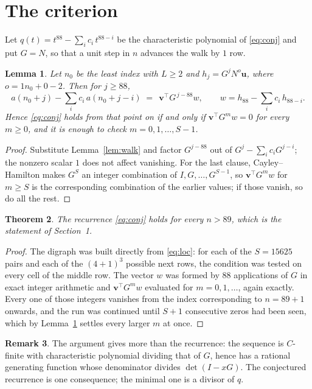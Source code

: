 \documentclass[11pt,a4paper]{article}
\theoremstyle{plain}
\newtheorem{theorem}{Theorem}
\newtheorem{lemma}[theorem]{Lemma}
\theoremstyle{definition}
\newtheorem{remark}[theorem]{Remark}
\begin{document}
\section{The criterion}

Let $q(t)=t^{88}-\sum_i c_i\,t^{88-i}$ be the characteristic polynomial of
\eqref{eq:conj} and put $G=N$, so that a unit step in $n$ advances the walk by
$1$ row.

\begin{lemma}\label{lem:crit}
Let $n_0$ be the least index with $L\ge2$ and $h_j=G^{j}N^{o}\mathbf{u}$, where
$o=1n_0+0-2$. Then for $j\ge88$,
\[
a(n_0+j)-\sum_i c_i\,a(n_0+j-i)\;=\;\,\mathbf{v}^{\!\top}G^{\,j-88}w,
\qquad w=h_{88}-\sum_i c_i\,h_{88-i} .
\]
Hence \eqref{eq:conj} holds from that point on if and only if
$\mathbf{v}^{\!\top}G^{m}w=0$ for every $m\ge0$, and it is enough to check
$m=0,1,\dots,S-1$.
\end{lemma}

\begin{proof}
Substitute Lemma~\ref{lem:walk} and factor $G^{j-88}$ out of
$G^{j}-\sum_ic_iG^{j-i}$; the nonzero scalar $1$ does not affect
vanishing. For the last clause, Cayley--Hamilton makes $G^{S}$ an integer combination of
$I,G,\dots,G^{S-1}$, so $\mathbf{v}^{\!\top}G^{m}w$ for $m\ge S$ is the corresponding
combination of the earlier values; if those vanish, so do all the rest.
\end{proof}

\begin{theorem}
The recurrence \eqref{eq:conj} holds for every $n>89$, which is the statement of
Section~1.
\end{theorem}

\begin{proof}
The digraph was built directly from \eqref{eq:loc}: for each of the $S=15625$ pairs and each
of the $(4+1)^{3}$ possible next rows, the condition was tested on every cell of
the middle row. The vector $w$ was formed by $88$ applications of $G$ in exact integer
arithmetic and $\mathbf{v}^{\!\top}G^{m}w$ evaluated for $m=0,1,\dots$, again exactly.
Every one of those integers vanishes from the index corresponding to $n=89+1$ onwards,
and the run was continued until $S+1$ consecutive zeros had been seen, which by
Lemma~\ref{lem:crit} settles every larger $m$ at once.
\end{proof}

\begin{remark}
The argument gives more than the recurrence: the sequence is $C$-finite with characteristic
polynomial dividing that of $G$, hence has a rational generating function whose denominator
divides $\det(I-xG)$. The conjectured recurrence is one consequence; the minimal one is a
divisor of $q$.
\end{remark}
\end{document}
